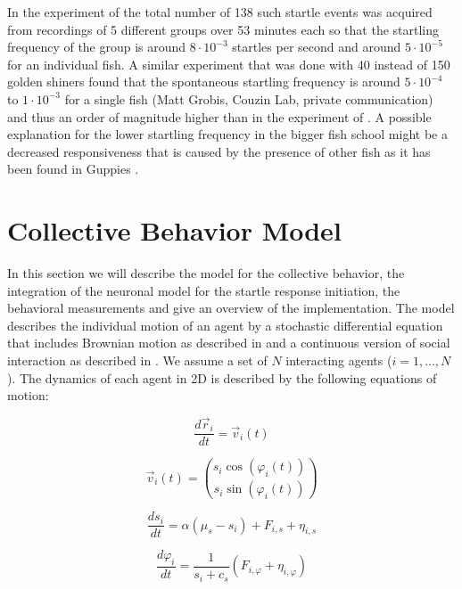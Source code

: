 \documentclass[a4paper,10pt,hidelinks]{scrreprt}
\begin{document}
    In the experiment of \cite{Rosenthal2015} the total number of 138 such startle events was acquired from recordings of 5 different groups over 53 minutes each so that the startling frequency of the group is around $8\cdot 10^{-3}$ startles per second and around $5\cdot 10^{-5}$ for an individual fish.
    A similar experiment that was done with 40 instead of 150 golden shiners found that the spontaneous startling frequency is around $5\cdot 10^{-4}$ to $1\cdot 10^{-3}$ for a single fish (Matt Grobis, Couzin Lab, private communication) and thus an order of magnitude higher than in the experiment of \cite{Rosenthal2015}.
    A possible explanation for the lower startling frequency in the bigger fish school might be a decreased responsiveness that is caused by the presence of other fish as it has been found in Guppies \citep{Fischer2015}.
    \section{Collective Behavior Model}\label{swarm_methods}
    In this section we will describe the model for the collective behavior, the integration of the neuronal model for the startle response initiation, the behavioral measurements and give an overview of the implementation.
	The model describes the individual motion of an agent by a stochastic differential equation that includes Brownian motion as described in \cite{Romanczuk2012a} and a continuous version of social interaction as described in \cite{Couzin2002}.
	We assume a set of $N$ interacting agents ($i= 1,\dots, N$).
	The dynamics of each agent in 2D is described by the following equations of motion:

	\begin{equation}
		\frac{d \vec{r}_i}{dt}=\vec{v}_i(t)
		\label{eq:r_diff}
	\end{equation}
	
	\begin{equation}
		\vec{v}_i(t) = {s_i\cos(\varphi_i(t)) \choose s_i\sin(\varphi_i(t)) }
		\label{eq:v_def}
	\end{equation}
	
	\begin{equation}
		\frac{d s_i}{dt} = \alpha\left( \mu_{s} - s_i\right) + F_{i, s} + \eta_{i, s}
		\label{eq:s_diff}
	\end{equation}
	
	\begin{equation}
		\frac{d \varphi_i}{dt} = \frac{1}{s_i + c_{s}}\left( F_{i,\varphi} + \eta_{i,\varphi} \right)
		\label{eq:phi_diff}
	\end{equation}
	
\end{document}
